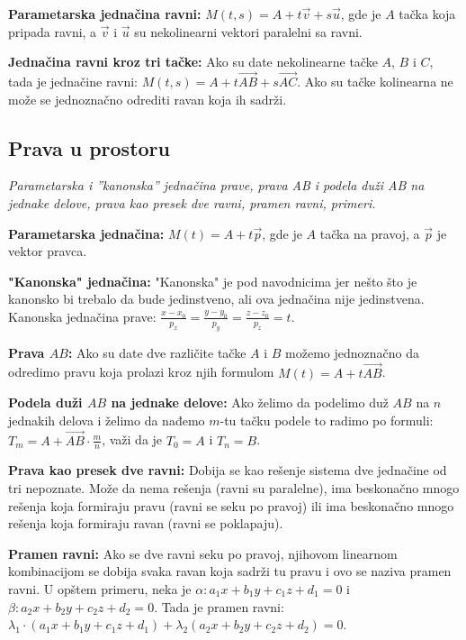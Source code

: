 \documentclass[12pt]{article}
\newcommand{\vek}[1]{\overrightarrow{#1}}
\begin{document}
\textbf{Parametarska jednačina ravni:} $M(t,s)=A+t\vek{v}+s\vek{u}$, gde je $A$
tačka koja pripada ravni, a $\vek{v}$ i $\vek{u}$ su nekolinearni vektori
paralelni sa ravni.
\par

\textbf{Jednačina ravni kroz tri tačke:} Ako su date nekolinearne tačke $A$,
$B$ i $C$, tada je jednačine ravni: $M(t,s)=A+t\vek{AB}+s\vek{AC}$.
Ako su tačke kolinearna ne može se jednoznačno odrediti ravan koja ih sadrži.
\par

\subsection{Prava u prostoru}
\textit{Parametarska i ”kanonska” jednačina prave, prava AB i podela duži AB
    na jednake delove, prava kao presek dve ravni, pramen ravni, primeri.}
\par
\vspace*{1cm}

\textbf{Parametarska jednačina:} $M(t)=A+t\vek{p}$, gde je $A$ tačka na pravoj,
a $\vek{p}$ je vektor pravca.
\par

\textbf{"Kanonska" jednačina:} "Kanonska" je pod navodnicima jer nešto što je
kanonsko bi trebalo da bude jedinstveno, ali ova jednačina nije jedinstvena.
Kanonska jednačina prave:
$\frac{x-x_0}{p_x}=\frac{y-y_0}{p_y}=\frac{z-z_0}{p_z}=t$.
\par

\textbf{Prava $AB$:} Ako su date dve različite tačke $A$ i $B$ možemo
jednoznačno da odredimo pravu koja prolazi kroz njih formulom
$M(t)=A+t\vek{AB}$.
\par

\textbf{Podela duži $AB$ na jednake delove:} Ako želimo da podelimo duž $AB$ na
$n$ jednakih delova i želimo da nađemo $m$-tu tačku podele to radimo po formuli:
$T_m=A+\vek{AB}\cdot\frac{m}{n}$, važi da je $T_0=A$ i $T_n=B$.
\par

\textbf{Prava kao presek dve ravni:} Dobija se kao rešenje sistema dve
jednačine od tri nepoznate. Može da nema rešenja (ravni su paralelne), ima
beskonačno mnogo rešenja koja formiraju pravu (ravni se seku po pravoj) ili ima
beskonačno mnogo rešenja koja formiraju ravan (ravni se poklapaju).
\par

\textbf{Pramen ravni:} Ako se dve ravni seku po pravoj, njihovom linearnom
kombinacijom se dobija svaka ravan koja sadrži tu pravu i ovo se naziva pramen
ravni. U opštem primeru, neka je $\alpha: a_1x+b_1y+c_1z+d_1=0$ i
$\beta: a_2x+b_2y+c_2z+d_2=0$. Tada je pramen ravni:
$\lambda_1\cdot(a_1x+b_1y+c_1z+d_1)+\lambda_2(a_2x+b_2y+c_2z+d_2)=0$.
\end{document}
